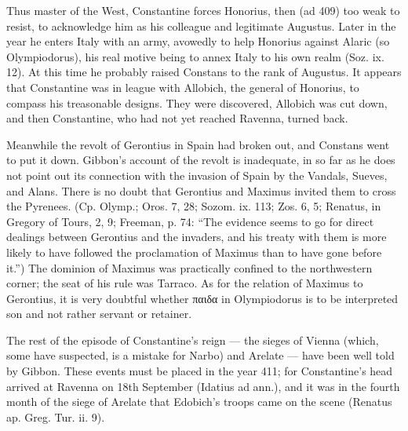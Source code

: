 Thus master of the West, Constantine forces Honorius, then (ad 409) too weak to resist, to acknowledge him as his colleague and legitimate Augustus. Later in the year he enters Italy with an army, avowedly to help Honorius against Alaric (so Olympiodorus), his real motive being to annex Italy to his own realm (Soz. ix. 12). At this time he probably raised Constans to the rank of Augustus. It appears that Constantine was in league with Allobich, the general of Honorius, to compass his treasonable designs. They were discovered, Allobich was cut down, and then Constantine, who had not yet reached Ravenna, turned back.

Meanwhile the revolt of Gerontius in Spain had broken out, and Constans went to put it down. Gibbon\texthebrew{}’s account of the revolt is inadequate, in so far as he does not point out its connection with the invasion of Spain by the Vandals, Sueves, and Alans. There is no doubt that Gerontius and Maximus invited them to cross the Pyrenees. (Cp. Olymp.; Oros. 7, 28; Sozom. ix. 113; Zos. 6, 5; Renatus, in Gregory of Tours, 2, 9; Freeman, p. 74: \texthebrew{“}The evidence seems to go for direct dealings between Gerontius and the invaders, and his treaty with them is more likely to have followed the proclamation of Maximus than to have gone before it.\texthebrew{}”) The dominion of Maximus was practically confined to the northwestern corner; the seat of his rule was Tarraco. As for the relation of Maximus to Gerontius, it is very doubtful whether \textgreek{παιδα} in Olympiodorus is to be interpreted son and not rather servant or retainer.

The rest of the episode of Constantine\texthebrew{}’s reign \texthebrew{—} the sieges of Vienna (which, some have suspected, is a mistake for Narbo) and Arelate \texthebrew{—} have been well told by Gibbon. These events must be placed in the year 411; for Constantine\texthebrew{}’s head arrived at Ravenna on 18th September (Idatius ad ann.), and it was in the fourth month of the siege of Arelate that Edobich\texthebrew{}’s troops came on the scene (Renatus ap. Greg. Tur. ii. 9).

